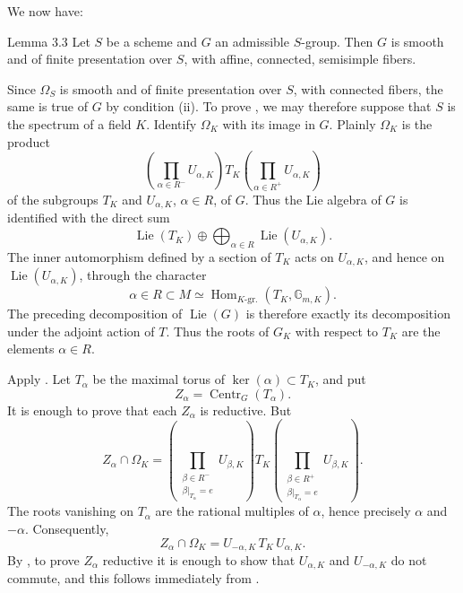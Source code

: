 We now have:

\begin{sgastatement}{Lemma 3.3}
Let \(S\) be a scheme and \(G\) an admissible \(S\)-group. Then \(G\)
is smooth and of finite presentation over \(S\), with affine,
connected, semisimple fibers.
\end{sgastatement}

Since \(\Omega_S\) is smooth and of finite presentation over \(S\),
with connected fibers, the same is true of \(G\) by condition (ii).
To prove , we may therefore suppose that \(S\) is the spectrum of a
field \(K\). Identify \(\Omega_K\) with its image in \(G\). Plainly
\(\Omega_K\) is the product
\[
 \left(\prod_{\alpha\in R^-}U_{\alpha,K}\right)
 T_K
 \left(\prod_{\alpha\in R^+}U_{\alpha,K}\right)
\]
of the subgroups \(T_K\) and \(U_{\alpha,K}\), \(\alpha\in R\), of
\(G\). Thus the Lie algebra of \(G\) is identified with the direct sum
\[
 \operatorname{Lie}(T_K)
 \oplus
 \bigoplus_{\alpha\in R}\operatorname{Lie}(U_{\alpha,K}).
\]
The inner automorphism defined by a section of \(T_K\) acts on
\(U_{\alpha,K}\), and hence on \(\operatorname{Lie}(U_{\alpha,K})\),
through the character
\[
 \alpha\in R\subset M
 \simeq\operatorname{Hom}_{K\text{-gr.}}(T_K,\mathbb G_{m,K}).
\]
The preceding decomposition of \(\operatorname{Lie}(G)\) is therefore
exactly its decomposition under the adjoint action of \(T\). Thus the
roots of \(G_K\) with respect to \(T_K\) are the elements
\(\alpha\in R\).

Apply . Let \(T_\alpha\) be the maximal torus of
\(\ker(\alpha)\subset T_K\), and put
\[
 Z_\alpha=\operatorname{Centr}_G(T_\alpha).
\]
It is enough to prove that each \(Z_\alpha\) is reductive. But
\[
 Z_\alpha\cap\Omega_K
 =
 \left(
 \prod_{\substack{\beta\in R^-\\\beta|_{T_\alpha}=e}}
 U_{\beta,K}
 \right)
 T_K
 \left(
 \prod_{\substack{\beta\in R^+\\\beta|_{T_\alpha}=e}}
 U_{\beta,K}
 \right).
\]
The roots vanishing on \(T_\alpha\) are the rational multiples of
\(\alpha\), hence precisely \(\alpha\) and \(-\alpha\). Consequently,
\[
 Z_\alpha\cap\Omega_K
 =U_{-\alpha,K}\,T_K\,U_{\alpha,K}.
\]
By , to prove \(Z_\alpha\) reductive it is enough to show
that \(U_{\alpha,K}\) and \(U_{-\alpha,K}\) do not commute, and this
follows immediately from .

